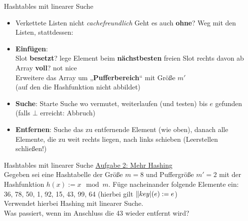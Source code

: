 \begin{frame}{Hashtables mit linearer Suche}
	\begin{itemize}
		\item Verkettete Listen nicht \textit{cachefreundlich} \impl Geht es auch \textbf{ohne}?
		\pause
		\implitem Weg mit den Listen, stattdessen:
		\pause 
		\item \textbf{Einfügen}: \\ 
		Slot \textbf{besetzt}? \impl lege Element beim \textbf{nächstbesten} freien Slot rechts davon ab\\
		\pause
		Array \textbf{voll}? \impl not nice \\ 
		\impl Erweitere das Array um „\textbf{Pufferbereich}“ mit Größe $m'$ \\ (auf den die Hashfunktion nicht abbildet)
		\pause
		\item \textbf{Suche}: Starte Suche wo vermutet, weiterlaufen (und testen) bis $e$ gefunden (falls $\bot$ erreicht: Abbruch)
		\pause
		\item \textbf{Entfernen}: Suche das zu entfernende Element (wie oben), danach alle Elemente, die zu weit rechts liegen, nach links schieben (\impl Leerstellen schließen!)
	\end{itemize}
\end{frame}


\begin{frame}{Hashtables mit linearer Suche}
	\underline{Aufgabe 2: Mehr Hashing} \\
	Gegeben sei eine Hashtabelle der Größe $m = 8$ und Puffergröße $m' = 2$ mit der Hashfunktion $h(x) := x \mod m$. Füge nacheinander folgende Elemente ein: \\ 36, 78, 50, 1, 92, 15, 43, 99, 64 \quad (hierbei gilt $\|key|(e) := e$) \\
	Verwendet hierbei Hashing mit linearer Suche. \\ 
	Was passiert, wenn im Anschluss die 43 wieder entfernt wird?
\end{frame}

